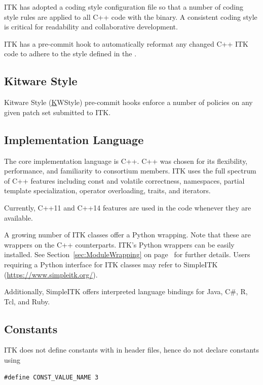 ITK has adopted a  coding style configuration file so
that a number of coding style rules are applied to all C++ code with the
 binary. A consistent coding style is critical for
readability and collaborative development.

ITK has a pre-commit hook to automatically reformat any changed C++ ITK code
to adhere to the style defined in the .


\subsection{Kitware Style}%
\label{subsec:KWStyle}

Kitware Style (\href{https://kitware.github.io/KWStyle/} KWStyle) pre-commit
hooks enforce a number of policies on any given patch set submitted to ITK.


\subsection{Implementation Language}%
\label{subsec:ImplementationLanguage}

The core implementation language is C++. C++ was chosen for its flexibility,
performance, and familiarity to consortium members. ITK uses the full spectrum
of C++ features including const and volatile correctness, namespaces, partial
template specialization, operator overloading, traits, and iterators.

Currently, C++11 and C++14 features are used in the code whenever they are
available.

A growing number of ITK classes offer a Python wrapping. Note that these are
wrappers on the C++ counterparts. ITK's Python wrappers can be easily installed.
See Section~\ref{sec:ModuleWrapping} on page~\pageref{sec:ModuleWrapping} for
further details. Users requiring a Python interface for ITK classes may refer to
SimpleITK (\href{https://www.simpleitk.org/}{https://www.simpleitk.org/}).

Additionally, SimpleITK offers interpreted language bindings for Java, C\#, R,
Tcl, and Ruby.


\subsection{Constants}%
\label{subsec:Constants}

ITK does not define constants with  in header files, hence do not
declare constants using
\small
\begin{verbatim}
#define CONST_VALUE_NAME 3
\end{verbatim}
\normalsize

